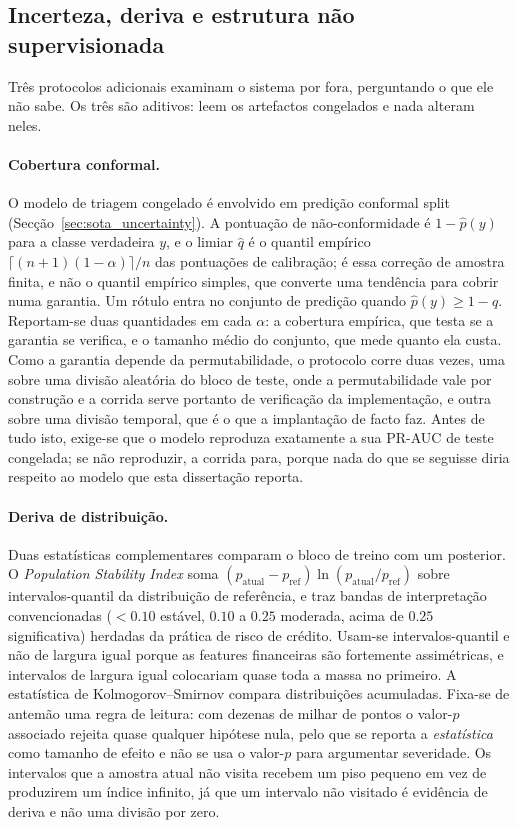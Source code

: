 \subsection{Incerteza, deriva e estrutura não supervisionada}
\label{sec:met_eval_uncertainty}

Três protocolos adicionais examinam o sistema por fora, perguntando o que ele não sabe. Os três são
aditivos: leem os artefactos congelados e nada alteram neles.

\paragraph{Cobertura conformal.} O modelo de triagem congelado é envolvido em predição conformal
split (Secção~\ref{sec:sota_uncertainty}). A pontuação de não-conformidade é $1 - \hat{p}(y)$ para a
classe verdadeira $y$, e o limiar $\hat{q}$ é o quantil empírico
$\lceil (n+1)(1-\alpha)\rceil / n$ das pontuações de calibração; é essa correção de amostra finita,
e não o quantil empírico simples, que converte uma tendência para cobrir numa garantia. Um rótulo
entra no conjunto de predição quando $\hat{p}(y) \ge 1 - \hat{q}$. Reportam-se duas quantidades em
cada $\alpha$: a cobertura empírica, que testa se a garantia se verifica, e o tamanho médio do
conjunto, que mede quanto ela custa. Como a garantia depende da permutabilidade, o protocolo corre
duas vezes, uma sobre uma divisão aleatória do bloco de teste, onde a permutabilidade vale por
construção e a corrida serve portanto de verificação da implementação, e outra sobre uma divisão
temporal, que é o que a implantação de facto faz. Antes de tudo isto, exige-se que o modelo
reproduza exatamente a sua PR-AUC de teste congelada; se não reproduzir, a corrida para, porque nada
do que se seguisse diria respeito ao modelo que esta dissertação reporta.

\paragraph{Deriva de distribuição.} Duas estatísticas complementares comparam o bloco de treino com
um posterior. O \emph{Population Stability Index} soma $(p_{\text{atual}} - p_{\text{ref}})
\ln(p_{\text{atual}} / p_{\text{ref}})$ sobre intervalos-quantil da distribuição de referência, e
traz bandas de interpretação convencionadas ($<0.10$ estável, $0.10$ a $0.25$ moderada, acima de
$0.25$ significativa) herdadas da prática de risco de crédito. Usam-se intervalos-quantil e não de
largura igual porque as features financeiras são fortemente assimétricas, e intervalos de largura
igual colocariam quase toda a massa no primeiro. A estatística de Kolmogorov--Smirnov compara
distribuições acumuladas. Fixa-se de antemão uma regra de leitura: com dezenas de milhar de pontos o
valor-$p$ associado rejeita quase qualquer hipótese nula, pelo que se reporta a \emph{estatística}
como tamanho de efeito e não se usa o valor-$p$ para argumentar severidade. Os intervalos que a
amostra atual não visita recebem um piso pequeno em vez de produzirem um índice infinito, já que um
intervalo não visitado é evidência de deriva e não uma divisão por zero.

